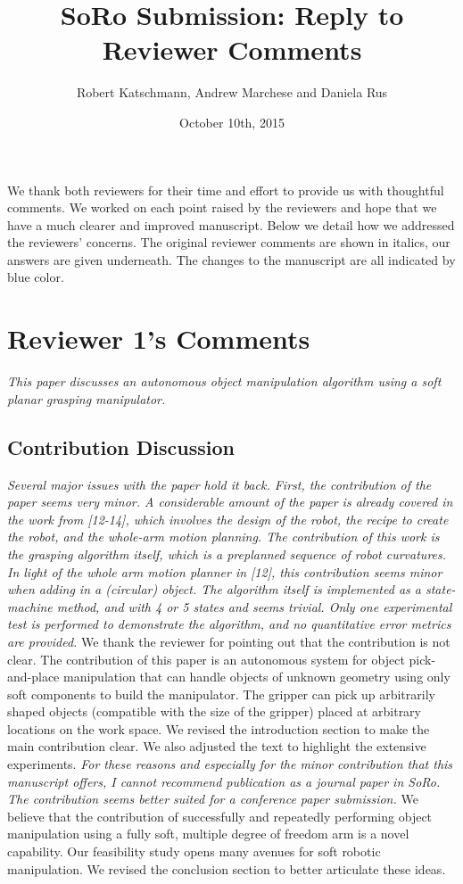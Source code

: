 \documentclass[letterpaper, 10 pt, twocolumn, conference]{article}
\begin{document}
\title{SoRo Submission: Reply to Reviewer Comments}
\author{Robert Katschmann, Andrew Marchese and Daniela Rus}
\date{October 10th, 2015}
\maketitle

We thank both reviewers for their time and effort to provide us with thoughtful comments. We worked on each point raised by the reviewers and hope that we have a much clearer and improved manuscript. Below we detail how we addressed the reviewers’ concerns. The original reviewer comments are shown in italics, our answers are given underneath. The changes to the manuscript are all indicated by blue color.


\section{Reviewer 1's Comments}

\textit{This paper discusses an autonomous object manipulation algorithm using a soft planar grasping manipulator.}

\subsection{Contribution Discussion}
\textit{Several major issues with the paper hold it back. First, the contribution of the paper seems very minor. A considerable amount of the paper is already covered in the work from [12-14], which involves the design of the robot, the recipe to create the robot, and the whole-arm motion planning. The contribution of this work is the grasping algorithm itself, which is a preplanned sequence of robot curvatures. In light of the whole arm motion planner in [12], this contribution seems minor when adding in a (circular) object.  The algorithm itself is implemented as a state-machine method, and with 4 or 5 states and seems trivial. Only one experimental test is performed to demonstrate the algorithm, and no quantitative error metrics are provided.}
%
We thank the reviewer for pointing out that the contribution is not clear. The contribution of this paper is an autonomous system for object pick-and-place manipulation that can handle objects of unknown geometry using only soft components to build the manipulator. The gripper can pick up arbitrarily shaped objects (compatible with the size of the gripper) placed at arbitrary locations on the work space. We revised the introduction section to make the main contribution clear. We also adjusted the text to highlight the extensive experiments. 
%
\textit{For these reasons and especially for the minor contribution that this manuscript offers, I cannot recommend publication as a journal paper in SoRo. The contribution seems better suited for a conference paper submission.}
%
We believe that the contribution of successfully and repeatedly performing object manipulation using a fully soft, multiple degree of freedom arm is a novel capability. Our feasibility study opens many avenues for soft robotic manipulation. We revised the conclusion section to better articulate these ideas. 
%
\end{document}
